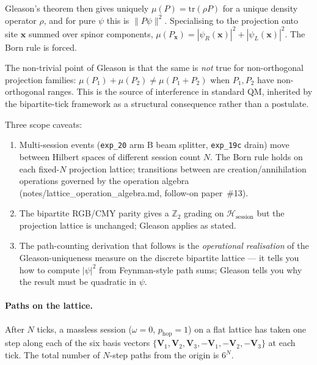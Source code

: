 Gleason's theorem then gives uniquely $\mu(P) = \mathrm{tr}(\rho P)$
for a unique density operator $\rho$, and for pure $\psi$ this is
$\|P\psi\|^2$.  Specialising to the projection onto site $\mathbf{x}$
summed over spinor components, $\mu(P_\mathbf{x}) =
|\psi_R(\mathbf{x})|^2 + |\psi_L(\mathbf{x})|^2$.  The Born rule is
forced.

The non-trivial point of Gleason is that the same is \emph{not} true
for non-orthogonal projection families: $\mu(P_1) + \mu(P_2) \ne
\mu(P_1 + P_2)$ when $P_1, P_2$ have non-orthogonal ranges.  This is
the source of interference in standard QM, inherited by the
bipartite-tick framework as a structural consequence rather than a
postulate.

Three scope caveats:

\begin{enumerate}
\item Multi-session events (\texttt{exp\_20} arm B beam splitter,
\texttt{exp\_19c} drain) move between Hilbert spaces of different
session count $N$.  The Born rule holds on each fixed-$N$ projection
lattice; transitions between are creation/annihilation operations
governed by the operation algebra (notes/lattice\_operation\_algebra.md,
follow-on paper~\#13).
\item The bipartite RGB/CMY parity gives a $\mathbb{Z}_2$ grading on
$\mathcal{H}_\text{session}$ but the projection lattice is unchanged;
Gleason applies as stated.
\item The path-counting derivation that follows is the
\emph{operational realisation} of the Gleason-uniqueness measure on
the discrete bipartite lattice --- it tells you how to compute
$|\psi|^2$ from Feynman-style path sums; Gleason tells you why the
result must be quadratic in $\psi$.
\end{enumerate}

\paragraph{Paths on the lattice.}
After $N$ ticks, a massless session ($\omega = 0$, $p_\mathrm{hop} = 1$)
on a flat lattice has taken one step along each of the six basis vectors
$\{\mathbf{V}_1, \mathbf{V}_2, \mathbf{V}_3, -\mathbf{V}_1, -\mathbf{V}_2,
-\mathbf{V}_3\}$ at each tick.
The total number of $N$-step paths from the origin is $6^N$.

